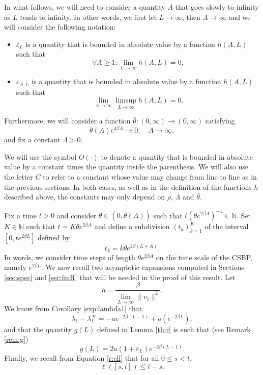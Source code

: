 \documentclass[11pt]{article}
\theoremstyle{plain}
\newcommand\linf{\lambda_1^\infty}
\newcommand\vep{\varepsilon}
\begin{document}
In what follows, we will need to consider a quantity $A$ that goes slowly to infinity as $L$ tends to infinity. In other words, we first let $L\rightarrow \infty$, then $A\rightarrow \infty$ and we will consider the following notation:
\begin{itemize}
\item $\vep_L$ is a quantity that is bounded in absolute value by a function $h(A,L)$ such that $$\forall A\geqslant 1:\lim_{L\rightarrow \infty}h(A,L)=0,$$
\item $\vep_{A,L}$ is a quantity that is bounded in absolute value by a function $h(A,L)$ such that $$\lim_{A\rightarrow \infty}\limsup_{L\rightarrow \infty}h(A,L)=0.$$
\end{itemize}
Furthermore, we will consider a function $\bar{\theta}:(0,\infty)\rightarrow (0,\infty)$ satisfying
\begin{equation}
\bar{\theta}(A)e^{4\beta A}\rightarrow 0, \quad A\to\infty, \label{cond:theta}
\end{equation}
and fix a constant $\Lambda>0$.

We will use the symbol $O(\cdot)$ to denote a quantity that is bounded in absolute value by a constant times the quantity inside the parenthesis. We will also use the letter $C$ to refer to a constant whose value may change from line to line as in the previous sections. In both cases, as well as in the definition of the functions $h$ described above, the constants may only depend on $\rho$, $\Lambda$ and $\bar{\theta}$.


Fix a time $t>0$ and consider $\theta \in (0,\bar{\theta}(A))$ such that $t\left(\theta e^{2\beta A}\right)^{-1}\in \mathbb{N}$. Set $K\in \mathbb{N}$ such that $t =K\theta e^{2\beta A}$  and define a  subdivision $(t_k)_{k=1}^{K}$ of the interval $[0,t e^{2\beta L}]$ defined by
\begin{equation}
t_k=k\theta e^{2\beta (L+A)}\label{disc:t}.
\end{equation}
In words, we consider time steps of length $\theta e^{2\beta A}$ on the time scale of the CSBP, namely $e^{2\beta L}$. We  now recall two asymptotic expansions computed in Sections \ref{sec:spec} and \ref{sec:fmR} that will be needed in the proof of this result. 
Let
\begin{equation*}
a=\frac{\beta}{\lim\limits_{L\rightarrow\infty}\|v_1\|^2}.
\end{equation*}We know from Corollary \ref{exp:lambda1} that 
 \begin{equation}
\lambda_1-\linf=-ae^{-2\beta(L-1)}+o(e^{-2\beta L}),\label{DL}
\end{equation}
and that the quantity $g(L)$ defined in Lemma \ref{th:r} is such that (see Remark \ref{rem:g})
\begin{equation}
g(L)=2a(1+\vep_L)e^{-2\beta(L-1)}. \label{eq:DLg}
\end{equation}
Finally, we recall from Equation \eqref{r:ell} that for all $0\leqslant s <t$, 
\begin{equation}
\ell([s,t]) \leqslant t-s.\label{rk:l}
\end{equation}
\end{document}
